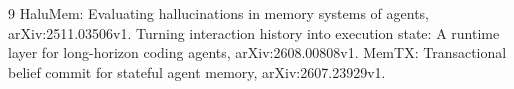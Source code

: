 \begin{thebibliography}{9}
 HaluMem: Evaluating hallucinations in memory systems of agents,
arXiv:2511.03506v1.
 Turning interaction history into execution state:
A runtime layer for long-horizon coding agents, arXiv:2608.00808v1.
 MemTX: Transactional belief commit for stateful agent memory,
arXiv:2607.23929v1.
\end{thebibliography}
